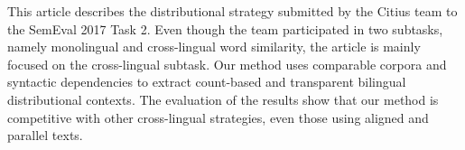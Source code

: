 This article describes the distributional strategy submitted by the Citius team to the SemEval 2017 Task 2. Even though the team participated in two subtasks, namely monolingual and cross-lingual word similarity, the article is mainly focused on the cross-lingual subtask. Our method uses comparable corpora and syntactic dependencies to extract count-based and transparent bilingual distributional contexts. The evaluation of the results show that our method is competitive with other cross-lingual strategies, even those using aligned and parallel texts.
